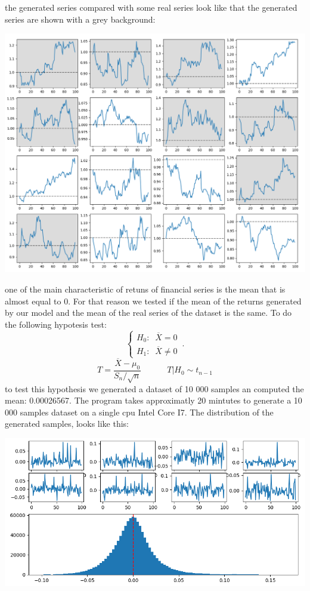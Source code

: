 \documentclass{article}
\begin{document}
    \newpage
    the generated series compared with some real series look like that the generated series are shown with a grey background:
    \begin{center}
        \includegraphics[scale=0.5]{imgs/series_comparison_README.png}
    \end{center}
    one of the main characteristic of retuns of financial series is the mean that is almost equal to 0. For that reason we tested if the mean of the returns generated by our model and the mean 
    of the real series of the dataset is the same. To do the following hypotesis test:
    \begin{equation}
        \begin{cases}
        H_0: \;\; \overline{X}=0\\
        H_1: \;\; \overline{X} \neq 0
    \end{cases}\,.
    \end{equation}
    $$T=\frac{\overline{X}-\mu_0}{S_n/\sqrt{n}} \;\;\;\;\;\;\;\;\;\;\; T|H_0 \sim t_{n-1}$$
    to test this hypothesis we generated a dataset of 10 000 samples an computed the mean: 0.00026567.
    \newpage
    The program takes approximatly 20 mintutes to generate a 10 000 samples dataset on a single cpu Intel Core I7. The distribution of the generated samples, looks like this:
    \begin{center}
        \includegraphics[scale=0.7]{imgs/generated.png}
    \end{center}
\end{document}
